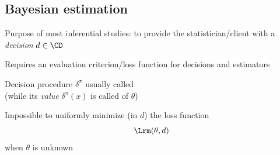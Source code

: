 \subsection{Bayesian estimation}
\begin{slide}

Purpose of most inferential studies:
to provide the statistician/client with a
{\it decision} $d\in\CD$

\pause
Requires an evaluation criterion/{\sf loss function} for decisions and estimators
{}

\pause\bigskip
{}
\rightline{\Brown{\sf [DeGroot, 1970]}}



\end{slide}\begin{slide}

Decision procedure $\delta^\pi$ usually called
{}\\ (while its {\it value} $\delta^\pi(x)$
is called {} of $\theta$)

\pause\bigskip
Impossible to uniformly minimize  (in $d$)  the loss function
$$
\Lrm(\theta,d)
$$
when $\theta$ is unknown




\end{slide}
